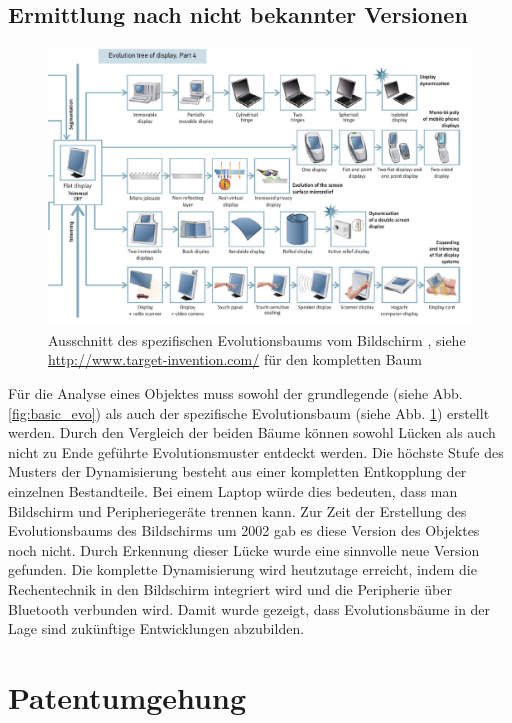 \documentclass[11pt,a4paper]{article}
\begin{document}
\subsection{Ermittlung nach nicht bekannter Versionen}
\begin{figure}[htb]
  \centering
  \includegraphics[width=0.9\linewidth]{figures/removable display.PNG}
  \caption{\small Ausschnitt des spezifischen Evolutionsbaums vom Bildschirm
    \cite{evo}, siehe \url{http://www.target-invention.com/} für den
    kompletten Baum}
  \label{fig:spez_evo}
\end{figure}

Für die Analyse eines Objektes muss sowohl der grundlegende (siehe
Abb. \ref{fig:basic_evo}) als auch der spezifische Evolutionsbaum (siehe
Abb. \ref{fig:spez_evo}) erstellt werden. Durch den Vergleich der beiden Bäume
können sowohl Lücken als auch nicht zu Ende geführte Evolutionsmuster entdeckt
werden. Die höchste Stufe des Musters der Dynamisierung besteht aus einer
kompletten Entkopplung der einzelnen Bestandteile. Bei einem Laptop würde dies
bedeuten, dass man Bildschirm und Peripheriegeräte trennen kann. Zur Zeit der
Erstellung des Evolutionsbaums des Bildschirms um 2002 gab es diese Version
des Objektes noch nicht. Durch Erkennung dieser Lücke wurde eine sinnvolle
neue Version gefunden. Die komplette Dynamisierung wird heutzutage erreicht,
indem die Rechentechnik in den Bildschirm integriert wird und die Peripherie
über Bluetooth verbunden wird. Damit wurde gezeigt, dass Evolutionsbäume in
der Lage sind zukünftige Entwicklungen abzubilden.

\section{Patentumgehung}
\end{document}
